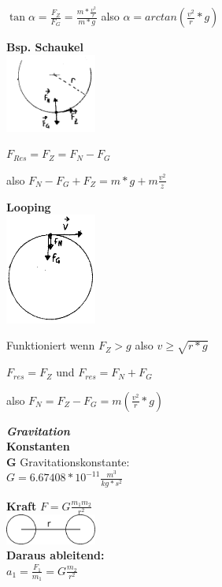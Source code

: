 \documentclass[a4paper,9pt]{article}
\begin{document}
\begin{multicols}{4}
	$ \tan{\alpha} = \frac{F_Z}{F_G} = \frac{m*\frac{v^2}{r}}{m*g} $ also $ \alpha = arctan(\frac{v^2}{r} *g) $  
	
	

\textbf{Bsp. Schaukel}\\
	
	\includegraphics[width=3cm]{gr6}
	
	$ F_{Res} = F_Z = F_N - F_G  $
	
	also $ F_N - F_G + F_Z = m * g + m\frac{v^2}{z} $
	
	

\textbf{Looping}\\
	
	\includegraphics[width=3cm]{gr7}
	
	Funktioniert wenn $ F_Z > g $ also $ v \ge \sqrt{r * g} $
	
	$ F_{res} = F_Z $ und $ F_{res} = F_N + F_G $
	
	also $ F_N = F_Z - F_G = m(\frac{v^2}{r}*g) $
	
	

\textbf{\textit{Gravitation}}\\
	

\textbf{Konstanten}\\
	

\textbf{G} Gravitationskonstante:\\
	\(G=6.67408*10^{-11}\frac{m^3}{kg*s^2} \)
	

\textbf{Kraft}
	\(F=G\frac{m_1 m_2}{r^2} \)\\
	\includegraphics[width=3cm]{radius}\\
	

\textbf{Daraus ableitend:}\\
	\(a_1 = \frac{F_1}{m_1}=G\frac{m_2}{r^2} \)\\
	


\end{multicols}
\end{document}
